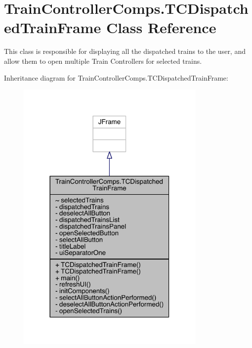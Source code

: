 \hypertarget{classTrainControllerComps_1_1TCDispatchedTrainFrame}{}\section{Train\+Controller\+Comps.\+T\+C\+Dispatched\+Train\+Frame Class Reference}
\label{classTrainControllerComps_1_1TCDispatchedTrainFrame}


This class is responsible for displaying all the dispatched trains to the user, and allow them to open multiple Train Controllers for selected trains.  




Inheritance diagram for Train\+Controller\+Comps.\+T\+C\+Dispatched\+Train\+Frame\+:
\nopagebreak
\begin{figure}[H]
\begin{center}
\leavevmode
\includegraphics[width=261pt]{classTrainControllerComps_1_1TCDispatchedTrainFrame__inherit__graph}
\end{center}
\end{figure}


